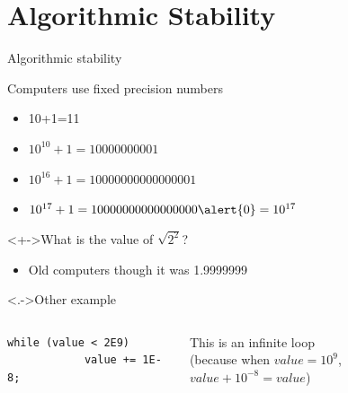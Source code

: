\section{Algorithmic Stability}\sectionpage
\begin{frame}[fragile]{Algorithmic stability}

  \begin{block}{Computers use fixed precision numbers}
    \begin{itemize}
    \item<+-> 10+1=11
    \item<+-> $10^{10}+1=10000000001$
    \item<+-> $10^{16}+1=10000000000000001$
    \item<+-> $10^{17}+1=10000000000000000\alert{0}=10^{17}$
    \end{itemize}
  \end{block}

  \begin{block}<+->{What is the value of $\sqrt{2^2}$?}
    \begin{itemize}
    \item Old computers though it was 1.9999999
    \end{itemize}
  \end{block}

  \begin{block}<.->{Other example}
    \begin{columns}
      \begin{column}{.27\linewidth}
        \begin{Verbatim}[gobble=9]
          while (value < 2E9) 
            value += 1E-8;
        \end{Verbatim}
      \end{column}
      \begin{column}{.6\linewidth}
        This is an infinite loop\\
        {\small(because when $value=10^9$, $value+10^{-8}=value$)}
      \end{column}
    \end{columns}
  \end{block}

  \medskip

  \medskip{}
\end{frame}
